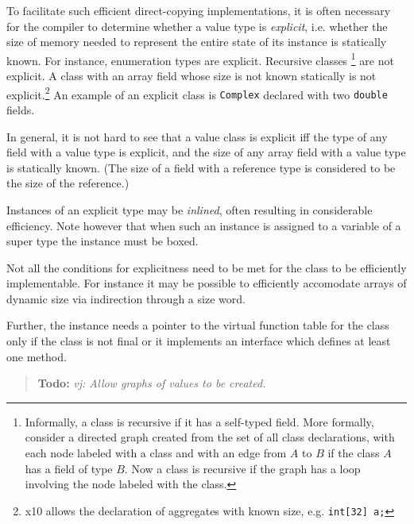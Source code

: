 \documentclass{article}
\def\ccfont{\sf}
\def\x10{{\ccfont x10}}
\newcommand \todo[1] {\begin{quotation}{\bf Todo:} {\footnotesize\em #1}\end{quotation}}
\begin{document}
To facilitate such efficient direct-copying implementations, it is
often necessary for the compiler to determine whether a value type is
{\em explicit}, i.e.{} whether the size of memory needed to represent
the entire state of its instance is statically known.  For instance,
enumeration types are explicit. Recursive classes
\footnote{Informally, a class is recursive if it has a self-typed field. More formally, consider a directed graph created from the set of all class declarations, with each node labeled with a class and with an edge from $A$ to $B$ if
the class $A$ has a field of type $B$. Now a class is recursive if the
graph has a loop involving the node labeled with the class.}  are not
explicit. A class with an array field whose size is not known
statically is not explicit.\footnote{\x10{} allows the declaration of
aggregates with known size, e.g. {\tt int[32] a;} } An example of an
explicit class is {\tt Complex} declared with two {\tt double} fields.

In general, it is not hard to see that a value class is explicit iff
the type of any field with a value type is explicit, and the size of
any array field with a value type is statically known. (The size of
a field with a reference type is considered to be the size of the
reference.)

Instances of an explicit type may be {\em inlined}, often resulting in
considerable efficiency. Note however that when such an instance is
assigned to a variable of a super type the instance must be boxed.

Not all the conditions for explicitness need to be met for the class
to be efficiently implementable. For instance it may be possible to
efficiently accomodate arrays of dynamic size via indirection through
a size word.


Further, the instance needs a pointer to the virtual function table
for the class only if the class is not final or it implements an
interface which defines at least one method.

\todo{vj: Allow graphs of values to be created.}
\end{document}

